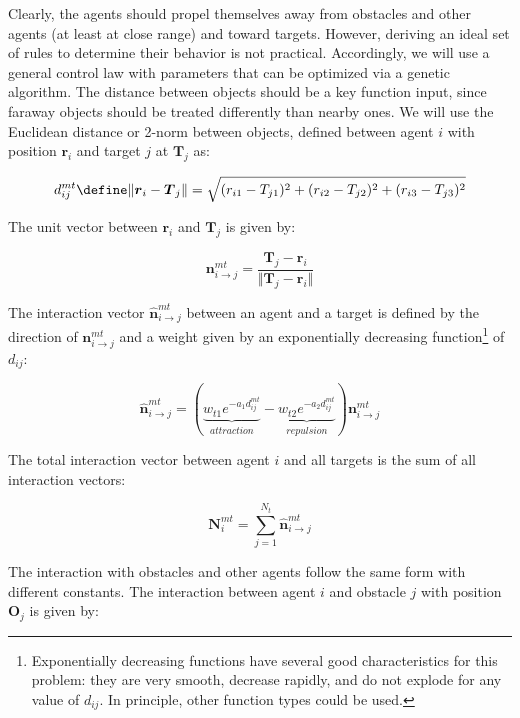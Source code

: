\documentclass{article}
\begin{document}
Clearly, the agents should propel themselves away from obstacles and other agents (at least at close range) and toward targets. However, deriving an ideal set of rules to determine their behavior is not practical. Accordingly, we will use a general control law with parameters that can be optimized via a genetic algorithm. The distance between objects should be a key function input, since faraway objects should be treated differently than nearby ones. We will use the Euclidean distance or 2-norm between objects, defined between agent $i$ with position $\boldsymbol{r}_i$ and target $j$ at $\boldsymbol{T}_j$ as: 

\begin{equation}
    d^{mt}_{ij} \define \Vert \boldsymbol{r}_i - \boldsymbol{T}_j \Vert = \sqrt{(r_{i1} - T_{j1})^2 + (r_{i2} - T_{j2})^2 + (r_{i3} - T_{j3})^2} 
\end{equation}

The unit vector between $\boldsymbol{r}_i$ and  $\boldsymbol{T}_j$ is given by: 

\begin{equation}
    \boldsymbol{n}_{i\to j}^{mt} = \frac{\boldsymbol{T}_j - \boldsymbol{r}_i}{\Vert \boldsymbol{T}_j - \boldsymbol{r}_i \Vert}
\end{equation}

The interaction vector $\boldsymbol{\hat{n}}_{i\to j}^{mt} $ between an agent and a target is defined by the direction of $\boldsymbol{n}_{i\to j}^{mt}$ and a weight given by an exponentially decreasing function\footnote{Exponentially decreasing functions have several good characteristics for this problem: they are very smooth, decrease rapidly, and do not explode for any value of $d_{ij}$. In principle, other function types could be used.} of $d_{ij}$: 

\begin{equation}\label{nMThat}
    \boldsymbol{\hat{n}}_{i\to j}^{mt}  = (\underbrace{w_{t1}e^{-a_1d^{mt}_{ij}}}_{attraction} - \underbrace{w_{t2}e^{-a_2d^{mt}_{ij}}}_{repulsion})\boldsymbol{n}_{i\to j}^{mt} 
\end{equation}

The total interaction vector between agent $i$ and all targets is the sum of all interaction vectors: 

\begin{equation}
    \boldsymbol{N}_i^{mt} = \sum_{j = 1}^{N_t}\boldsymbol{\hat{n}}_{i\to j}^{mt}
\end{equation}

The interaction with obstacles and other agents follow the same form with different constants. The interaction between agent $i$ and obstacle $j$ with position $\boldsymbol{O}_j$ is given by: 
\end{document}
